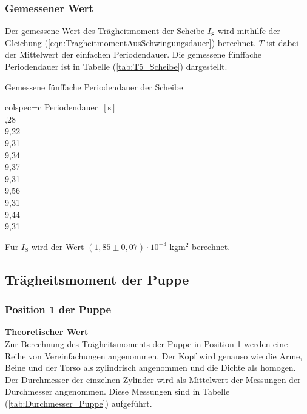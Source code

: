     \subsubsection{Gemessener Wert}
    Der gemessene Wert des Trägheitmoment der Scheibe $I_{\text{S}}$ wird mithilfe der Gleichung (\ref{eqn:TragheitmomentAusSchwingungsdauer}) berechnet.
    $T$ ist dabei der Mittelwert der einfachen Periodendauer. Die gemessene fünffache Periodendauer ist in Tabelle (\ref{tab:T5_Scheibe}) dargestellt.
    \begin{table}[H]
      \centering 
      \caption{Gemessene fünffache Periodendauer der Scheibe}
      \label{tab:T5_Scheibe}
      \begin{tblr}{colspec={c}}
          \toprule
          Periodendauer $\,[\unit{\second}]$ \\
          ,28 \\
          9,22 \\
          9,31 \\
          9,34 \\
          9,37 \\
          9,31 \\
          9,56 \\
          9,31 \\
          9,44 \\
          9,31 \\
          \bottomrule
      \end{tblr}
    \end{table}
    Für $I_{\text{S}}$ wird der Wert $(1,85 \pm 0,07) \cdot 10^{-3} \,\,\unit{\kilo\gram\meter\squared}$ berechnet. 
     
  
  \subsection{Trägheitsmoment der Puppe}
    \subsubsection{Position 1 der Puppe}
      \textbf{Theoretischer Wert}\\
        Zur Berechnung des Trägheitsmoments der Puppe in Position 1 werden eine Reihe von Vereinfachungen angenommen. Der Kopf wird genauso
        wie die Arme, Beine und der Torso als zylindrisch angenommen und die Dichte als homogen. Der Durchmesser der einzelnen Zylinder wird 
        als Mittelwert der Messungen der Durchmesser angenommen. Diese Messungen sind in Tabelle (\ref{tab:Durchmesser_Puppe}) aufgeführt. 

